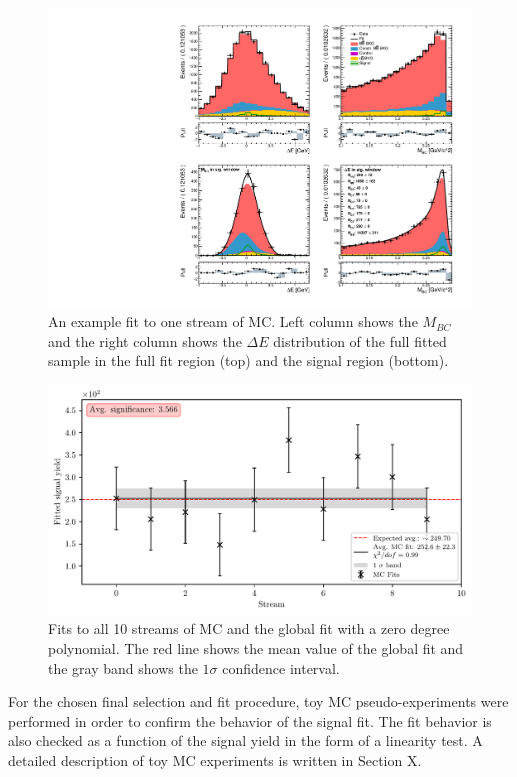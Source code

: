 \begin{figure}[!htbp]
	\centering
	\captionsetup{width=0.8\linewidth}
	\includegraphics[width=\linewidth]{fig/sig_fit_mc}
	\caption{An example fit to one stream of MC. Left column shows the $M_{BC}$ and the right column shows the $\Delta E$ distribution of the full fitted sample in the full fit region (top) and the signal region (bottom).}
	\label{fig:sig_streamfit}
\end{figure}

\begin{figure}[!htbp]
	\centering
	\captionsetup{width=0.8\linewidth}
	\includegraphics[width=\linewidth]{fig/sig_global_mc}
	\caption{Fits to all 10 streams of MC and the global fit with a zero degree polynomial. The red line shows the mean value of the global fit and the gray band shows the $1\sigma$ confidence interval.}
	\label{fig:sig_global}
\end{figure}

For the chosen final selection and fit procedure, toy MC pseudo-experiments were performed in order to confirm the behavior of the signal fit. The fit behavior is also checked as a function of the signal yield in the form of a linearity test. A detailed description of toy MC experiments is written in Section X.

